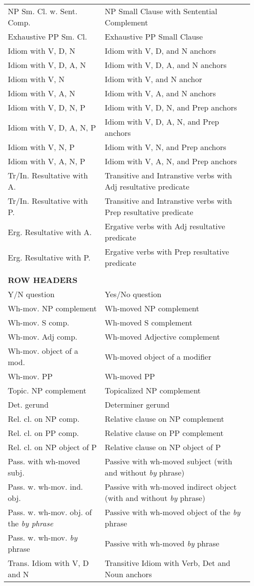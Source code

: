 \begin{tabular}{ll}
NP Sm. Cl. w. Sent. Comp.&NP Small Clause with Sentential Complement\\
Exhaustive PP Sm. Cl.&Exhaustive PP Small Clause\\
Idiom with V, D, N & Idiom with V, D, and N anchors \\
Idiom with V, D, A, N & Idiom with V, D, A, and N anchors \\
Idiom with V, N & Idiom with V, and N anchor \\
Idiom with V, A, N & Idiom with V, A, and N anchors \\
Idiom with V, D, N, P & Idiom with V, D, N, and Prep anchors \\
Idiom with V, D, A, N, P & Idiom with V, D, A, N, and Prep anchors \\
Idiom with V, N, P & Idiom with V, N, and Prep anchors \\
Idiom with V, A, N, P & Idiom with V, A, N, and Prep anchors \\
Tr/In. Resultative with A. & Transitive and Intranstive verbs with Adj
resultative predicate\\
Tr/In. Resultative with P. & Transitive and Intranstive verbs with Prep
resultative predicate\\
Erg. Resultative with A. & Ergative verbs with Adj
resultative predicate\\
Erg. Resultative with P. & Ergative verbs with Prep
resultative predicate\\
& \\
\hline
{\bf ROW HEADERS} & \\
\hline
Y/N question&Yes/No question \\
Wh-mov. NP complement&Wh-moved NP complement \\
Wh-mov. S comp.&Wh-moved S complement \\
Wh-mov. Adj comp.&Wh-moved Adjective complement \\
Wh-mov. object of a mod.&Wh-moved object of a modifier \\
Wh-mov. PP&Wh-moved PP \\
Topic. NP complement&Topicalized NP complement \\
Det. gerund&Determiner gerund \\
Rel. cl. on NP comp.&Relative clause on NP complement \\
Rel. cl. on PP comp.& Relative clause on PP complement\\
Rel. cl. on NP object of P& Relative clause on NP object of P\\
Pass. with wh-moved subj.&Passive with wh-moved subject (with and without {\it by} phrase) \\
Pass. w. wh-mov. ind. obj.&Passive with wh-moved indirect object (with and without {\it by} phrase) \\
Pass. w. wh-mov. obj. of the {\it {\it by} phrase}&Passive with wh-moved object of the {\it by} phrase \\
Pass. w. wh-mov. {\it by} phrase&Passive with wh-moved {\it by} phrase \\
Trans. Idiom with V, D and N & Transitive Idiom with Verb, Det and
Noun anchors\\

\end{tabular}

